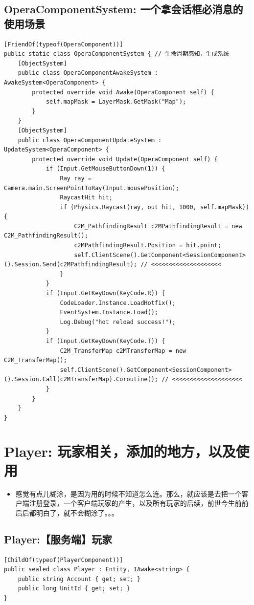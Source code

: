 \documentclass[9pt, b5paper]{article}
\begin{document}
\subsection{OperaComponentSystem: 一个拿会话框必消息的使用场景}
\label{sec-8-3}
\begin{verbatim}
[FriendOf(typeof(OperaComponent))]
public static class OperaComponentSystem { // 生命周期感知，生成系统
    [ObjectSystem]
    public class OperaComponentAwakeSystem : AwakeSystem<OperaComponent> {
        protected override void Awake(OperaComponent self) {
            self.mapMask = LayerMask.GetMask("Map");
        }
    }
    [ObjectSystem]
    public class OperaComponentUpdateSystem : UpdateSystem<OperaComponent> {
        protected override void Update(OperaComponent self) {
            if (Input.GetMouseButtonDown(1)) {
                Ray ray = Camera.main.ScreenPointToRay(Input.mousePosition);
                RaycastHit hit;
                if (Physics.Raycast(ray, out hit, 1000, self.mapMask)) {
                    C2M_PathfindingResult c2MPathfindingResult = new C2M_PathfindingResult();
                    c2MPathfindingResult.Position = hit.point;
                    self.ClientScene().GetComponent<SessionComponent>().Session.Send(c2MPathfindingResult); // <<<<<<<<<<<<<<<<<<<< 
                }
            }
            if (Input.GetKeyDown(KeyCode.R)) {
                CodeLoader.Instance.LoadHotfix();
                EventSystem.Instance.Load();
                Log.Debug("hot reload success!");
            }
            if (Input.GetKeyDown(KeyCode.T)) {
                C2M_TransferMap c2MTransferMap = new C2M_TransferMap();
                self.ClientScene().GetComponent<SessionComponent>().Session.Call(c2MTransferMap).Coroutine(); // <<<<<<<<<<<<<<<<<<<< 
            }
        }
    }
}
\end{verbatim}


\section{Player: 玩家相关，添加的地方，以及使用}
\label{sec-9}
\begin{itemize}
\item 感觉有点儿糊涂，是因为用的时候不知道怎么连。那么，就应该是去把一个客户端注册登录，一个客户端玩家的产生，以及所有玩家的后续，前世今生前前后后都明白了，就不会糊涂了。。。
\end{itemize}
\subsection{Player:【服务端】玩家}
\label{sec-9-1}
\begin{verbatim}
[ChildOf(typeof(PlayerComponent))]
public sealed class Player : Entity, IAwake<string> {
    public string Account { get; set; }
    public long UnitId { get; set; }
}
\end{verbatim}
\end{document}
